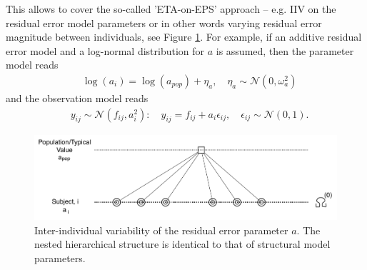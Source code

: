 This allows \pharmml to cover the so-called 'ETA-on-EPS' approach -- e.g. IIV on the residual error model parameters or in other words varying residual
error magnitude between individuals, see Figure \ref{fig:IOV0_residualError}.
For example, if an additive residual error model and a log-normal distribution for $a$ is assumed, then the parameter model reads
\begin{align*}
	& \log(a_i) = \log(a_{pop}) + \eta_a, \quad  \eta_a \sim \mathcal{N}(0,\omega_a^2)
\end{align*}
and the observation model reads
\begin{align*}
	& y_{ij} \sim \mathcal{N}(f_{ij},a_i^2): \quad y_{ij} = f_{ij} + a_i \epsilon_{ij}, \quad \epsilon_{ij} \sim \mathcal{N}(0,1).
\end{align*}
\begin{figure}[htb!]
\centering
  \includegraphics[width=130mm]{pics/IOV0}
 \caption{Inter-individual variability of the residual error parameter $a$. The nested hierarchical structure is identical to that of structural model parameters.}
 \label{fig:IOV0_residualError}
\end{figure}


